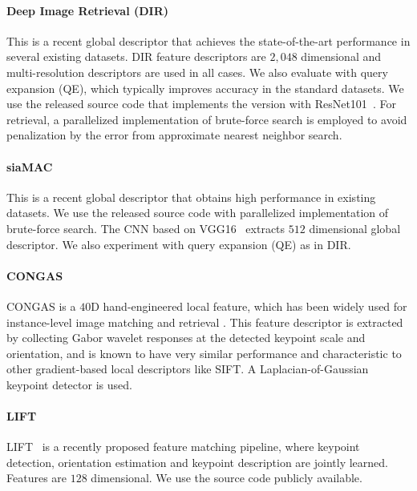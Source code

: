\documentclass[10pt,twocolumn,letterpaper]{article}
\begin{document}
\vspace{-10pt}
\paragraph{Deep Image Retrieval (DIR)~\cite{gordo2016deep}} 
This is a recent global descriptor that achieves the state-of-the-art performance in several existing datasets.  
DIR feature descriptors are $2,048$ dimensional and multi-resolution descriptors are used in all cases.  
We also evaluate with query expansion (QE), which typically improves accuracy in the standard datasets.
We use the released source code that implements the version with ResNet101~\cite{he2015deep}. 
For retrieval, a parallelized implementation of brute-force search is employed to avoid penalization by the error from approximate nearest neighbor search.


\vspace{-10pt}
\paragraph{siaMAC~\cite{radenovic2016cnn}} 
This is a recent global descriptor that obtains high performance in existing datasets.  
We use the released source code with parallelized implementation of brute-force search.
The CNN based on VGG16~\cite{Simonyan15} extracts $512$ dimensional global descriptor.  
We also experiment with query expansion (QE) as in DIR.


\vspace{-10pt}
\paragraph{CONGAS~\cite{buddemeier2012systems,neven2008image}} CONGAS is a $40$D hand-engineered local feature, which has been widely used for instance-level image matching and retrieval \cite{aradhye2009video2text,zheng2009tour}.  
This feature descriptor is extracted by collecting Gabor wavelet responses at the detected keypoint scale and orientation, and is known to have very similar performance and characteristic to other gradient-based local descriptors like SIFT. A Laplacian-of-Gaussian keypoint detector is used.


\vspace{-10pt}
\paragraph{LIFT} 
LIFT~\cite{yi2016lift} is a recently proposed feature matching pipeline, where keypoint detection, orientation estimation and keypoint description are jointly learned.  
Features are $128$ dimensional. 
We use the source code publicly available.
\end{document}
